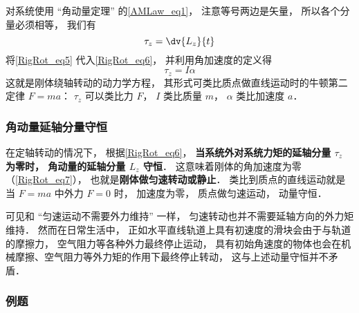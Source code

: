 对系统使用 “角动量定理” 的\autoref{AMLaw_eq1}， 注意等号两边是矢量， 所以各个分量必须相等， 我们有
\begin{equation}\label{RigRot_eq6}
\tau_z = \dv{L_z}{t}
\end{equation}
将\autoref{RigRot_eq5} 代入\autoref{RigRot_eq6}， 并利用角加速度的定义得
\begin{equation}\label{RigRot_eq7}
\tau_z = I\alpha
\end{equation}
这就是刚体绕轴转动的动力学方程， 其形式可类比质点做直线运动时的牛顿第二定律 $F = ma$： $\tau_z$ 可以类比力 $F$， $I$ 类比质量 $m$， $\alpha$ 类比加速度 $a$．

\subsubsection{角动量延轴分量守恒}
在定轴转动的情况下， 根据\autoref{RigRot_eq6}， \textbf{当系统外对系统力矩的延轴分量 $\tau_z$ 为零时， 角动量的延轴分量 $L_z$ 守恒}．  这意味着刚体的角加速度为零（\autoref{RigRot_eq7}）， 也就是\textbf{刚体做匀速转动或静止}． 类比到质点的直线运动就是当 $F = ma$ 中外力 $F = 0$ 时， 加速度为零， 质点做匀速运动， 动量守恒．

可见和 “匀速运动不需要外力维持” 一样， 匀速转动也并不需要延轴方向的外力矩维持． 然而在日常生活中， 正如水平直线轨道上具有初速度的滑块会由于与轨道的摩擦力， 空气阻力等各种外力最终停止运动， 具有初始角速度的物体也会在机械摩擦、空气阻力等外力矩的作用下最终停止转动， 这与上述动量守恒并不矛盾．

\subsubsection{例题}

